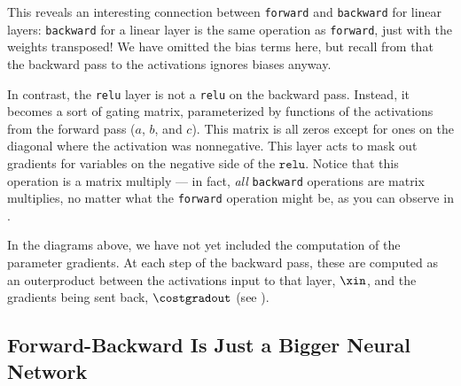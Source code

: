 This reveals an interesting connection between \texttt{forward} and \texttt{backward} for linear layers: \texttt{backward} for a linear layer is the same operation as \texttt{forward}, just with the weights transposed! We have omitted the bias terms here, but recall from \eqn{\ref{eqn:backpropagation:linear_backward_costgrad}} that the backward pass to the activations ignores biases anyway.

In contrast, the \texttt{relu} layer is not a \texttt{relu} on the backward pass. Instead, it becomes a sort of gating matrix, parameterized by functions of the activations from the forward pass ($a$, $b$, and $c$). This matrix is all zeros except for ones on the diagonal where the activation was nonnegative. This layer acts to mask out gradients for variables on the negative side of the $\texttt{relu}$. Notice that this operation is a matrix multiply — in fact, \textit{all} \texttt{backward} operations are matrix multiplies, no matter what the \texttt{forward} operation might be, as you can observe in \algref{\ref{alg:backpropagation:backprop_for_chains}}.%

In the diagrams above, we have not yet included the computation of the parameter gradients. At each step of the backward pass, these are computed as an outerproduct between the activations input to that layer, $\xin$, and the gradients being sent back, $\costgradout$ (see \fig{\ref{fig:backpropagation:parameter_grad_linear_matrices}}).

\subsection{Forward-Backward Is Just a Bigger Neural Network}\label{section:backpropagation:backprop_as_neural_net}

